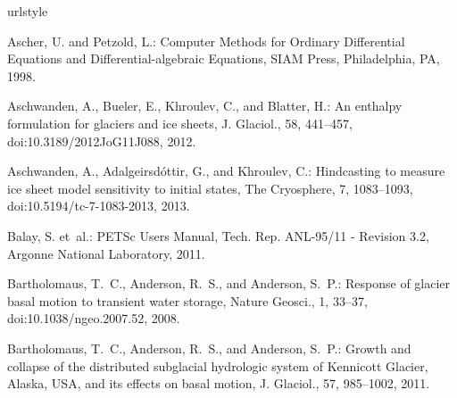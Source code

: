 \documentclass[gmd]{copernicus}   %
\providecommand{\DIFaddbegin}{} %
\providecommand{\DIFaddend}{} %
\providecommand{\DIFdelbegin}{} %
\providecommand{\DIFdelend}{} %
\begin{document}
\DIFdelbegin %
\DIFdelend \DIFaddbegin \begin{thebibliography}{}
\DIFaddend \providecommand{\natexlab}[1]{#1}
\providecommand{\url}[1]{{\tt #1}}
\providecommand{\urlprefix}{URL }
\expandafter\ifx\csname urlstyle\endcsname\relax
  \providecommand{\doi}[1]{doi:\discretionary{}{}{}#1}\else
  \providecommand{\doi}{doi:\discretionary{}{}{}\begingroup
  \urlstyle{rm}\Url}\fi

Ascher, U. and Petzold, L.: Computer {M}ethods for {O}rdinary {D}ifferential
  {E}quations and {D}ifferential-algebraic {E}quations, SIAM Press,
  Philadelphia, PA, 1998.

Aschwanden, A., Bueler, E., Khroulev, C., and Blatter, H.: An enthalpy
  formulation for glaciers and ice sheets, J. Glaciol., 58, 441--457,
  \doi{10.3189/2012JoG11J088}, 2012.

Aschwanden, A., Adalgeirsd{\'o}ttir, G., and Khroulev, C.: Hindcasting to
  measure ice sheet model sensitivity to initial states, The Cryosphere, 7,
  1083--1093, \doi{10.5194/tc-7-1083-2013}, 2013.

Balay, S. et~al.: {PETS}c {U}sers {M}anual, Tech. Rep. ANL-95/11 - Revision
  3.2, Argonne National Laboratory, 2011.

\DIFdelbegin %
\DIFdelend \DIFaddbegin {}
\DIFaddend Bartholomaus, T.~C., Anderson, R.~S., and Anderson, S.~P.: Response of glacier
  basal motion to transient water storage, Nature Geosci., 1, 33--37,
  \doi{10.1038/ngeo.2007.52}, 2008.

\DIFdelbegin %
\DIFdelend \DIFaddbegin {}
\DIFaddend Bartholomaus, T.~C., Anderson, R.~S., and Anderson, S.~P.: Growth and collapse
  of the distributed subglacial hydrologic system of {K}ennicott {G}lacier,
  {A}laska, {USA}, and its effects on basal motion, J. Glaciol., 57, 985--1002,
  2011.


\end{thebibliography}
\end{document}
